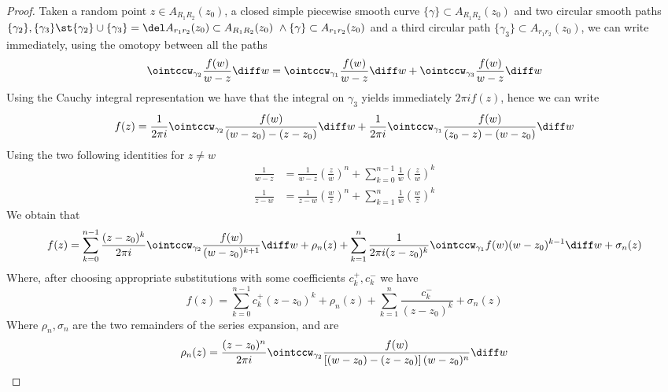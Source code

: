 \documentclass[../mmf.tex]{subfiles}
\begin{document}
\begin{proof}
	Taken a random point $z\in A_{R_1R_2}(z_0)$, a closed simple piecewise smooth curve $\{\gamma\}\subset A_{R_1R_2}(z_0)$ and two circular smooth paths $\{\gamma_2\},\{\gamma_3\}\st \{\gamma_2\}\cup\{\gamma_3\}=\del A_{r_1r_2}(z_0)\subset A_{R_1R_2}(z_0)\ \wedge \{\gamma\}\subset A_{r_1r_2}(z_0)$ and a third circular path $\{\gamma_3\}\subset A_{r_1r_2}(z_0)$, we can write immediately, using the omotopy between all the paths
	\begin{equation*}
		\ointccw_{\gamma_2}\frac{f(w)}{w-z}\diff w=\ointccw_{\gamma_1}\frac{f(w)}{w-z}\diff w+\ointccw_{\gamma_3}\frac{f(w)}{w-z}\diff w
	\end{equation*}
	Using the Cauchy integral representation we have that the integral on $\gamma_3$ yields immediately $2\pi if(z)$, hence we can write
	\begin{equation*}
		f(z)=\frac{1}{2\pi i}\ointccw_{\gamma_2}\frac{f(w)}{(w-z_0)-(z-z_0)}\diff w+\frac{1}{2\pi i}\ointccw_{\gamma_1}\frac{f(w)}{(z_0-z)-(w-z_0)}\diff w
	\end{equation*}
	Using the two following identities for $z\ne w$
	\begin{equation*}
		\begin{aligned}
			\frac{1}{w-z}&=\frac{1}{w-z}\left( \frac{z}{w} \right)^n+\sum_{k=0}^{n-1}\frac{1}{w}\left( \frac{z}{w} \right)^k\\
			\frac{1}{z-w}&=\frac{1}{z-w}\left( \frac{w}{z} \right)^n+\sum_{k=1}^{n}\frac{1}{w}\left( \frac{w}{z} \right)^k
		\end{aligned}
	\end{equation*}
	We obtain that
	\begin{equation*}
		f(z)=\sum_{k=0}^{n-1}\frac{(z-z_0)^k}{2\pi i}\ointccw_{\gamma_2}\frac{f(w)}{(w-z_0)^{k+1}}\diff w+\rho_n(z)+\sum_{k=1}^{n}\frac{1}{2\pi i(z-z_0)^k}\ointccw_{\gamma_1}f(w)(w-z_0)^{k-1}\diff w+\sigma_n(z)
	\end{equation*}
	Where, after choosing appropriate substitutions with some coefficients $c_k^+,c_k^-$ we have
	\begin{equation*}
		f(z)=\sum_{k=0}^{n-1}c_k^+(z-z_0)^k+\rho_n(z)+\sum_{k=1}^{n}\frac{c_k^-}{(z-z_0)^k}+\sigma_n(z)
	\end{equation*}
	Where $\rho_n,\sigma_n$ are the two remainders of the series expansion, and are
	\begin{equation*}
		\begin{aligned}
			\rho_n(z)&=\frac{(z-z_0)^n}{2\pi i}\ointccw_{\gamma_2}\frac{f(w)}{\left[ (w-z_0)-(z-z_0) \right](w-z_0)^n}\diff w\\

\end{aligned}
\end{equation*}
\end{proof}
\end{document}

